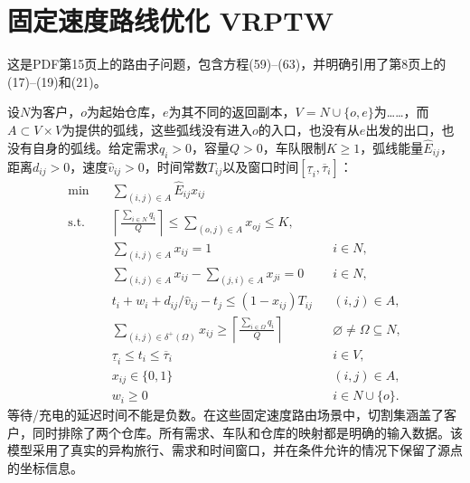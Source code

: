 \documentclass{article}
\begin{document}
\section*{固定速度路线优化 VRPTW}
这是PDF第15页上的路由子问题，包含方程(59)--(63)，并明确引用了第8页上的(17)--(19)和(21)。

设$N$为客户，$o$为起始仓库，$e$为其不同的返回副本，$V=N\cup\{o,e\}$为……，而$A\subset V\times V$为提供的弧线，这些弧线没有进入$o$的入口，也没有从$e$出发的出口，也没有自身的弧线。给定需求$q_i>0$，容量$Q>0$，车队限制$K\ge1$，弧线能量$\widehat E_{ij}$，距离$d_{ij}>0$，速度$\widehat v_{ij}>0$，时间常数$T_{ij}$以及窗口时间$[\underline\tau_i,\overline\tau_i]$：
\begin{align*}
\min\quad&\sum_{(i,j)\in A}\widehat E_{ij}x_{ij}\\
\text{s.t.}\quad&
\left\lceil\frac{\sum_{i\in N}q_i}{Q}\right\rceil
\le\sum_{(o,j)\in A}x_{oj}\le K,\\
&\sum_{(i,j)\in A}x_{ij}=1 &&i\in N,\\
&\sum_{(i,j)\in A}x_{ij}-\sum_{(j,i)\in A}x_{ji}=0 &&i\in N,\\
&t_i+w_i+d_{ij}/\widehat v_{ij}-t_j\le(1-x_{ij})T_{ij}&&(i,j)\in A,\\
&\sum_{(i,j)\in\delta^+(\Omega)}x_{ij}\ge
\left\lceil\frac{\sum_{i\in\Omega}q_i}{Q}\right\rceil
&&\varnothing\ne\Omega\subseteq N,\\
&\underline\tau_i\le t_i\le\overline\tau_i&&i\in V,\\
&x_{ij}\in\{0,1\}&&(i,j)\in A,\\
&w_i\ge0&&i\in N\cup\{o\}.
\end{align*}
等待/充电的延迟时间不能是负数。在这些固定速度路由场景中，切割集涵盖了客户，同时排除了两个仓库。所有需求、车队和仓库的映射都是明确的输入数据。该模型采用了真实的异构旅行、需求和时间窗口，并在条件允许的情况下保留了源点的坐标信息。
\end{document}
